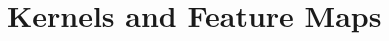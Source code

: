 \documentclass[11pt,a4paper]{article}
\newcommand{\bs}[1]{\boldsymbol{#1}}
\begin{document}
\section{Kernels and Feature Maps}
\newcommand{\kernel}{k(\bs{x},\bs{z})}
\newcommand{\xx}{\bs{x}}
\newcommand{\xone}{x_{1}}
\newcommand{\xtwo}{x_{2}}
\newcommand{\zz}{\bs{z}}
\newcommand{\zone}{z_{1}}
\newcommand{\ztwo}{z_{2}}
\newcommand{\xzcombo}{\xone\zone + \xtwo\ztwo}
\newcommand{\xzMM}{x_{M+1}z_{M+1}}
\newcommand{\xzone}[1]{\xone^{#1}\zone^{#1}}
\newcommand{\xztwo}[1]{\xtwo^{#1}\ztwo^{#1}}
\newcommand{\xxp}{\xx^{*}}
\newcommand{\zzp}{\zz^{*}}
\newcommand{\kold}{k_{M}(\bs{x},\bs{z})}
\newcommand{\knew}{k_{M+1}(\xxp,\zzp)}
\newcommand{\kpold}{k_{Q}(\bs{x},\bs{z})}
\newcommand{\kpnew}{k_{Q+1}(\xx,\zz)}
\newcommand{\sumxzM}{\sum_{i=1}^{M} x_{i} z_{i}}
\newcommand{\sumxzMM}{\sum_{i=1}^{M+1} x_{i} z_{i}}
\newcommand{\sumxzn}{\sum_{i=1}^{n} x_{i} z_{i}}
\newcommand{\PhiM}{\Phi_{M}}
\newcommand{\PhiMM}{\Phi_{M+1}}
\newcommand{\PhiMMs}[1]{\Phi_{(M+1)}^{\ifthenelse{#1=1} 
{*} {\ifthenelse{#1=2}{**}{\ifthenelse{#1=3}{***}{} } } } }
\newcommand{\PhiQ}{\Phi_{Q}}
\newcommand{\PhiQQ}{\Phi_{Q+1}}
\end{document}
